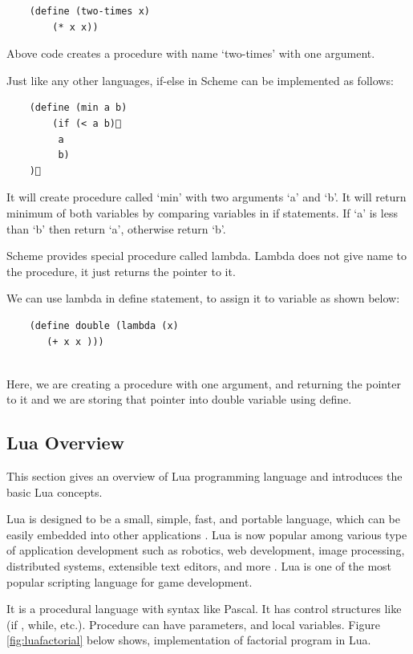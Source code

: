 \begin{lstlisting} 
	(define (two-times x)
		(* x x))
\end{lstlisting}


Above code creates a procedure with name `two-times' with one argument. 

Just like any other languages, if-else in Scheme can be implemented as follows:

\begin{lstlisting}
	(define (min a b)
		(if (< a b)
		 a	
		 b)
	)
\end{lstlisting}

It will create procedure called `min' with two arguments `a' and `b'. It will return minimum of both variables by comparing variables in if statements. If `a' is less than `b' then return `a', otherwise return `b'.

Scheme provides special procedure called lambda. Lambda does not give name to the procedure, it just returns the pointer to it.

We can use lambda in define statement, to assign it to variable as shown below:

\begin{lstlisting}
	(define double (lambda (x)
	   (+ x x )))
 
\end{lstlisting}


Here, we are creating a procedure with one argument, and returning the pointer to it and we are storing that pointer into double variable using define.	 

\subsection{Lua Overview}

This section gives an overview of Lua programming language \cite{Ierusalimschy:2006:LRM:1215067} and introduces the basic Lua concepts. 

Lua is designed to be a small, simple, fast, and portable language, which can be easily embedded into other applications \cite{spe96}. Lua is now popular among various type of application development such as robotics, web development, image processing, distributed systems, extensible text editors, and more \cite{luaprojects}. Lua is one of the most popular scripting language for game development.

It is a procedural language with syntax like Pascal. It has control structures like (if , while, etc.). Procedure can have parameters, and local variables. Figure \ref{fig:luafactorial} below shows, implementation of factorial program in Lua.

